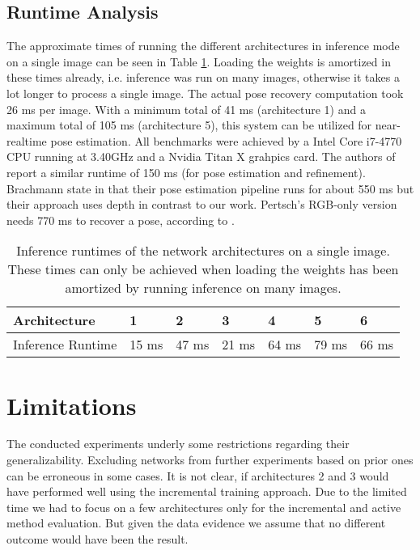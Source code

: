 \subsection{Runtime Analysis}

The approximate times of running the different architectures in inference mode on a single image can be seen in Table \ref{table:network_runtimes}. Loading the weights is amortized in these times already, i.e. inference was run on many images, otherwise it takes a lot longer to process a single image. The actual pose recovery computation took 26 ms per image. With a minimum total of 41 ms (architecture 1) and a maximum total of 105 ms (architecture 5), this system can be utilized for near-realtime pose estimation. All benchmarks were achieved by a Intel Core i7-4770 CPU running at 3.40GHz and a Nvidia Titan X grahpics card. The authors of \cite{bb8} report a similar runtime of 150 ms (for pose estimation and refinement). Brachmann \etal state in \cite{brachmann1} that their pose estimation pipeline runs for about 550 ms but their approach uses depth in contrast to our work. Pertsch's RGB-only version needs 770 ms to recover a pose, according to \cite{pertsch}.

\begin{table}[t]
\centering
\begin{tabular}{|l||llllll|}
\hline
Architecture      & 1     & 2     & 3     & 4     & 5     & 6     \\ \hline \hline \rowcolor{Gray}
Inference Runtime & 15 ms & 47 ms & 21 ms & 64 ms & 79 ms & 66 ms \\  \hline  
\end{tabular}
\caption{Inference runtimes of the network architectures on a single image. These times can only be achieved when loading the weights has been amortized by running inference on many images.}
\label{table:network_runtimes}
\end{table}

\section{Limitations}

The conducted experiments underly some restrictions regarding their generalizability. Excluding networks from further experiments based on prior ones can be erroneous in some cases. It is not clear, if architectures 2 and 3 would have performed well using the incremental training approach. Due to the limited time we had to focus on a few architectures only for the incremental and active method evaluation. But given the data evidence we assume that no different outcome would have been the result.

